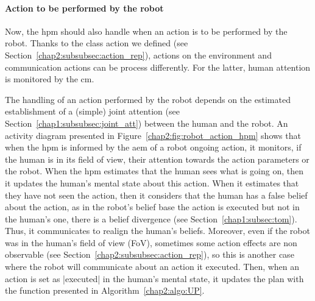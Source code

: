 \documentclass[a4paper,11pt,twoside]{StyleThese}
\begin{document}
\paragraph{Action to be performed by the robot} Now, the \acrshort{hpm} should also handle when an action is to be performed by the robot. Thanks to the class action we defined (see Section~\ref{chap2:subsubsec:action_rep}), actions on the environment and communication actions can be process differently. For the latter, human attention is monitored by the \acrlong{cm}. 

The handling of an action performed by the robot depends on the estimated establishment of a (simple) joint attention (see Section~\ref{chap1:subsubsec:joint_att}) between the human and the robot. An activity diagram presented in Figure~\ref{chap2:fig:robot_action_hpm} shows that when the \acrshort{hpm} is informed by the \acrfull{aem} of a robot ongoing action, it monitors, if the human is in its field of view, their attention towards the action parameters or the robot. When the \acrshort{hpm} estimates that the human sees what is going on, then it updates the human's mental state about this action. When it estimates that they have not seen the action, then it considers that the human has a false belief about the action, as in the robot's belief base the action is executed but not in the human's one, there is a belief divergence (see Section~\ref{chap1:subsec:tom}). Thus, it communicates to realign the human's beliefs. Moreover, even if the robot was in the human's field of view (FoV), sometimes some action effects are non observable (see Section~\ref{chap2:subsubsec:action_rep}), so this is another case where the robot will communicate about an action it executed. Then, when an action is set as |executed| in the human's mental state, it updates the plan with the function presented in Algorithm~\ref{chap2:algo:UP}.
\end{document}
